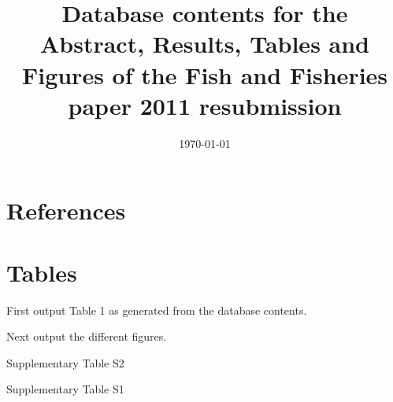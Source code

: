 \documentclass[letterpaper,review,authoryear,12pt]{myelsarticle}
\begin{document}
\begin{frontmatter}
\title{Database contents for the Abstract, Results, Tables and Figures of the Fish and Fisheries paper 2011 resubmission}
\date{\today}
\end{frontmatter}




\section*{References}



\section*{Tables}

First output Table 1 as generated from the database contents.
\begin{tiny}

\end{tiny}

Next output the different figures.

Supplementary Table S2

Supplementary Table S1
\begin{landscape}
\begin{tiny}

\end{tiny}
\end{landscape}
\end{document}
